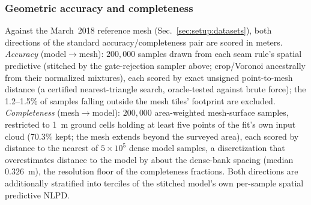 \subsubsection{Geometric accuracy and completeness}
 Against the March~2018 reference mesh
(Sec.~\ref{sec:setup:datasets}), both directions of the standard
accuracy/completeness pair are scored in meters.
\emph{Accuracy} (model${\to}$mesh): $200{,}000$ samples drawn from
each seam rule's spatial predictive (stitched by the gate-rejection
sampler above; crop/Voronoi ancestrally from their normalized
mixtures), each scored by exact unsigned point-to-mesh distance (a
certified nearest-triangle search, oracle-tested against brute force);
the 1.2--1.5\% of samples falling outside the mesh tiles' footprint
are excluded. \emph{Completeness} (mesh${\to}$model): $200{,}000$
area-weighted mesh-surface samples, restricted to 1~m ground cells
holding at least five points of the fit's own input cloud (70.3\%
kept; the mesh extends beyond the surveyed area), each scored by
distance to the nearest of $5\times10^{5}$ dense model samples, a
discretization that overestimates distance to the model by about the
dense-bank spacing (median $0.326$~m), the resolution floor of the
completeness fractions. Both directions are additionally stratified
into terciles of the stitched model's own per-sample spatial
predictive NLPD.

